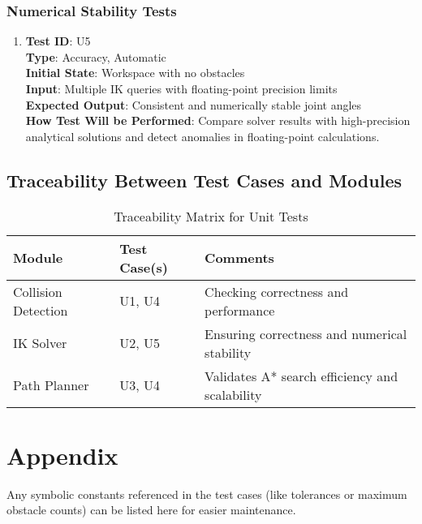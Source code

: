 \documentclass[12pt, titlepage]{article}
\begin{document}
\subsubsection{Numerical Stability Tests}

\begin{enumerate}
\item \textbf{Test ID}: U5 \\ 
\textbf{Type}: Accuracy, Automatic \\ 
\textbf{Initial State}: Workspace with no obstacles \\ 
\textbf{Input}: Multiple IK queries with floating-point precision limits \\ 
\textbf{Expected Output}: Consistent and numerically stable joint angles \\ 
\textbf{How Test Will be Performed}: Compare solver results with high-precision analytical solutions and detect anomalies in floating-point calculations.
\end{enumerate}

\subsection{Traceability Between Test Cases and Modules}

\begin{table}[h!]
  \centering
  \caption{Traceability Matrix for Unit Tests}
  \begin{tabular}{l l l}
  \toprule
  \textbf{Module} & \textbf{Test Case(s)} & \textbf{Comments}\\
  \midrule
  Collision Detection & U1, U4 & Checking correctness and performance \\
  IK Solver & U2, U5 & Ensuring correctness and numerical stability \\
  Path Planner & U3, U4 & Validates A* search efficiency and scalability \\
  \bottomrule
  \end{tabular}
\end{table}



\newpage

\section{Appendix}

Any symbolic constants referenced in the test cases (like tolerances or maximum obstacle counts) can be listed here for easier maintenance.
\end{document}

